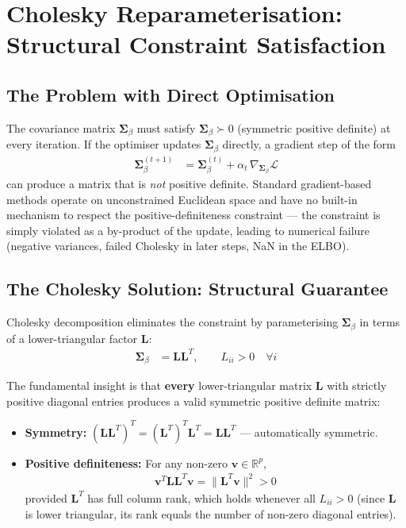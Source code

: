 \documentclass[11pt]{article}
\newcommand{\R}{\mathbb{R}}
\begin{document}
\section*{Cholesky Reparameterisation: Structural Constraint Satisfaction}

\subsection*{The Problem with Direct Optimisation}

The covariance matrix $\bm{\Sigma}_\beta$ must satisfy $\bm{\Sigma}_\beta \succ 0$ (symmetric positive definite) at every iteration. If the optimiser updates $\bm{\Sigma}_\beta$ directly, a gradient step of the form
\begin{align}
  \bm{\Sigma}_\beta^{(t+1)} &= \bm{\Sigma}_\beta^{(t)} + \alpha_t \,\nabla_{\bm{\Sigma}_\beta}\mathcal{L}
\end{align}
can produce a matrix that is \emph{not} positive definite. Standard gradient-based methods operate on unconstrained Euclidean space and have no built-in mechanism to respect the positive-definiteness constraint --- the constraint is simply violated as a by-product of the update, leading to numerical failure (negative variances, failed Cholesky in later steps, NaN in the ELBO).

\subsection*{The Cholesky Solution: Structural Guarantee}

Cholesky decomposition eliminates the constraint by parameterising $\bm{\Sigma}_\beta$ in terms of a lower-triangular factor $\bm{L}$:
\begin{align}
  \bm{\Sigma}_\beta &= \bm{L}\bm{L}^T, \qquad L_{ii} > 0 \quad \forall i
\end{align}

The fundamental insight is that \textbf{every} lower-triangular matrix $\bm{L}$ with strictly positive diagonal entries produces a valid symmetric positive definite matrix:

\begin{itemize}
  \item \textbf{Symmetry:} $(\bm{L}\bm{L}^T)^T = (\bm{L}^T)^T\bm{L}^T = \bm{L}\bm{L}^T$ \quad --- automatically symmetric.
  \item \textbf{Positive definiteness:} For any non-zero $\bm{v} \in \R^p$,
  \begin{align}
    \bm{v}^T \bm{L}\bm{L}^T \bm{v} = \|\bm{L}^T\bm{v}\|^2 > 0
  \end{align}
  provided $\bm{L}^T$ has full column rank, which holds whenever all $L_{ii} > 0$ (since $\bm{L}$ is lower triangular, its rank equals the number of non-zero diagonal entries).
\end{itemize}
\end{document}
